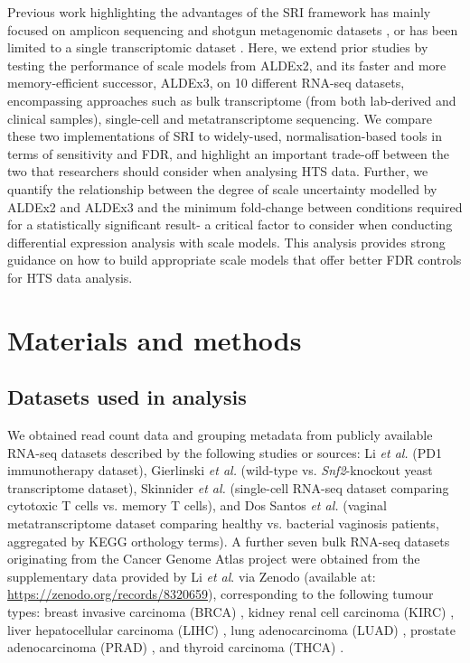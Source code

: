 \documentclass{article}
\begin{document}
Previous work highlighting the advantages of the SRI framework has mainly focused on amplicon sequencing and shotgun metagenomic datasets \cite{konnaris_uncertainty_2025}, or has been limited to a single transcriptomic dataset \cite{gloor_explicit_2025}. Here, we extend prior studies by testing the performance of scale models from ALDEx2, and its faster and more memory-efficient successor, ALDEx3, on 10 different RNA-seq datasets, encompassing approaches such as bulk transcriptome (from both lab-derived and clinical samples), single-cell and metatranscriptome sequencing. We compare these two implementations of SRI to widely-used, normalisation-based tools in terms of sensitivity and FDR, and highlight an important trade-off between the two that researchers should consider when analysing HTS data. Further, we quantify the relationship between the degree of scale uncertainty modelled by ALDEx2 and ALDEx3 and the minimum fold-change between conditions required for a statistically significant result- a critical factor to consider when conducting differential expression analysis with scale models. This analysis provides strong guidance on how to build appropriate scale models that offer better FDR controls for HTS data analysis.


\section{Materials and methods}

\subsection{Datasets used in analysis}
We obtained read count data and grouping metadata from publicly available RNA-seq datasets described by the following studies or sources: Li \textit{et al.} \cite{li_exaggerated_2022} (PD1 immunotherapy dataset), Gierlinski \textit{et al.} \cite{gierlinski_statistical_2015} (wild-type vs. \textit{Snf2}-knockout yeast transcriptome dataset), Skinnider \textit{et al.} \cite{skinnider_evaluating_2019} (single-cell RNA-seq dataset comparing cytotoxic T cells vs. memory T cells), and Dos Santos \textit{et al.} \cite{dos_santos_vaginal_2024} (vaginal metatranscriptome dataset comparing healthy vs. bacterial vaginosis patients, aggregated by KEGG orthology terms). A further seven bulk RNA-seq datasets originating from the Cancer Genome Atlas project \cite{weinstein_cancer_2013} were obtained from the supplementary data provided by Li \textit{et al}. via Zenodo \cite{li_supplement_2022} (available at: \url{https://zenodo.org/records/8320659}), corresponding to the following tumour types: breast invasive carcinoma (BRCA) \cite{tcga_brca_2012,tcga_brca_2015}, kidney renal cell carcinoma (KIRC) \cite{tcga_kirc_2013}, liver hepatocellular carcinoma (LIHC) \cite{tcga_lihc_2017}, lung adenocarcinoma (LUAD) \cite{tcga_luad_2016}, prostate adenocarcinoma (PRAD) \cite{tcga_prad_2015}, and thyroid carcinoma (THCA) \cite{tcga_thca_2014}.
\end{document}
